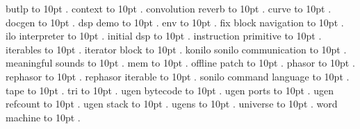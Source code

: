 \smallskip
\noindent butlp \leaders\hbox to 10pt {\hss.\hss}  \hfill {}
\smallskip
\noindent context \leaders\hbox to 10pt {\hss.\hss}  \hfill {}
\smallskip
\noindent convolution reverb \leaders\hbox to 10pt {\hss.\hss}  \hfill {}
\smallskip
\noindent curve \leaders\hbox to 10pt {\hss.\hss}  \hfill {}
\smallskip
\noindent docgen \leaders\hbox to 10pt {\hss.\hss}  \hfill {}
\smallskip
\noindent dsp demo \leaders\hbox to 10pt {\hss.\hss}  \hfill {}
\smallskip
\noindent env \leaders\hbox to 10pt {\hss.\hss}  \hfill {}
\smallskip
\noindent fix block navigation \leaders\hbox to 10pt {\hss.\hss}  \hfill {}
\smallskip
\noindent ilo interpreter \leaders\hbox to 10pt {\hss.\hss}  \hfill {}
\smallskip
\noindent initial dsp \leaders\hbox to 10pt {\hss.\hss}  \hfill {}
\smallskip
\noindent instruction primitive \leaders\hbox to 10pt {\hss.\hss}  \hfill {}
\smallskip
\noindent iterables \leaders\hbox to 10pt {\hss.\hss}  \hfill {}
\smallskip
\noindent iterator block \leaders\hbox to 10pt {\hss.\hss}  \hfill {}
\smallskip
\noindent konilo sonilo communication \leaders\hbox to 10pt {\hss.\hss}  \hfill {}
\smallskip
\noindent meaningful sounds \leaders\hbox to 10pt {\hss.\hss}  \hfill {}
\smallskip
\noindent mem \leaders\hbox to 10pt {\hss.\hss}  \hfill {}
\smallskip
\noindent offline patch \leaders\hbox to 10pt {\hss.\hss}  \hfill {}
\smallskip
\noindent phasor \leaders\hbox to 10pt {\hss.\hss}  \hfill {}
\smallskip
\noindent rephasor \leaders\hbox to 10pt {\hss.\hss}  \hfill {}
\smallskip
\noindent rephasor iterable \leaders\hbox to 10pt {\hss.\hss}  \hfill {}
\smallskip
\noindent sonilo command language \leaders\hbox to 10pt {\hss.\hss}  \hfill {}
\smallskip
\noindent tape \leaders\hbox to 10pt {\hss.\hss}  \hfill {}
\smallskip
\noindent tri \leaders\hbox to 10pt {\hss.\hss}  \hfill {}
\smallskip
\noindent ugen bytecode \leaders\hbox to 10pt {\hss.\hss}  \hfill {}
\smallskip
\noindent ugen ports \leaders\hbox to 10pt {\hss.\hss}  \hfill {}
\smallskip
\noindent ugen refcount \leaders\hbox to 10pt {\hss.\hss}  \hfill {}
\smallskip
\noindent ugen stack \leaders\hbox to 10pt {\hss.\hss}  \hfill {}
\smallskip
\noindent ugens \leaders\hbox to 10pt {\hss.\hss}  \hfill {}
\smallskip
\noindent universe \leaders\hbox to 10pt {\hss.\hss}  \hfill {}
\smallskip
\noindent word machine \leaders\hbox to 10pt {\hss.\hss}  \hfill {}

